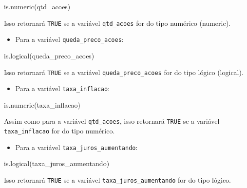 \documentclass[
  letterpaper,
  DIV=11,
  numbers=noendperiod]{scrreprt}
\newenvironment{Shaded}{\begin{snugshade}}{\end{snugshade}}
\newcommand{\FunctionTok}[1]{\textcolor[rgb]{0.28,0.35,0.67}{#1}}
\newcommand{\NormalTok}[1]{\textcolor[rgb]{0.00,0.23,0.31}{#1}}
\providecommand{\tightlist}{%
  \setlength{\itemsep}{0pt}\setlength{\parskip}{0pt}}\usepackage{longtable,booktabs,array}
\begin{document}
\begin{Shaded}
\begin{Highlighting}[]
\FunctionTok{is.numeric}\NormalTok{(qtd\_acoes)}
\end{Highlighting}
\end{Shaded}

Isso retornará \texttt{TRUE} se a variável \texttt{qtd\_acoes} for do
tipo numérico (numeric).

\begin{itemize}
\tightlist
\item
  Para a variável \texttt{queda\_preco\_acoes}:
\end{itemize}

\begin{Shaded}
\begin{Highlighting}[]
\FunctionTok{is.logical}\NormalTok{(queda\_preco\_acoes)}
\end{Highlighting}
\end{Shaded}

Isso retornará \texttt{TRUE} se a variável \texttt{queda\_preco\_acoes}
for do tipo lógico (logical).

\begin{itemize}
\tightlist
\item
  Para a variável \texttt{taxa\_inflacao}:
\end{itemize}

\begin{Shaded}
\begin{Highlighting}[]
\FunctionTok{is.numeric}\NormalTok{(taxa\_inflacao)}
\end{Highlighting}
\end{Shaded}

Assim como para a variável \texttt{qtd\_acoes}, isso retornará
\texttt{TRUE} se a variável \texttt{taxa\_inflacao} for do tipo
numérico.

\begin{itemize}
\tightlist
\item
  Para a variável \texttt{taxa\_juros\_aumentando}:
\end{itemize}

\begin{Shaded}
\begin{Highlighting}[]
\FunctionTok{is.logical}\NormalTok{(taxa\_juros\_aumentando)}
\end{Highlighting}
\end{Shaded}

Isso retornará \texttt{TRUE} se a variável
\texttt{taxa\_juros\_aumentando} for do tipo lógico.
\end{document}
